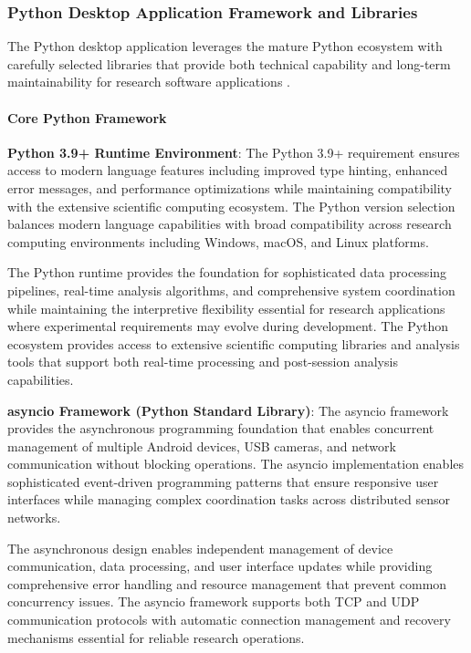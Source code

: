 \documentclass[11pt,a4paper]{article}
\begin{document}
\subsubsection{Python Desktop Application Framework and Libraries}

The Python desktop application leverages the mature Python ecosystem with carefully selected libraries that provide both
technical capability and long-term maintainability for research software applications .

\paragraph{Core Python Framework}

\textbf{Python 3.9+ Runtime Environment}: The Python 3.9+ requirement ensures access to modern language features including
improved type hinting, enhanced error messages, and performance optimizations while maintaining compatibility with the
extensive scientific computing ecosystem. The Python version selection balances modern language capabilities with broad
compatibility across research computing environments including Windows, macOS, and Linux platforms.

The Python runtime provides the foundation for sophisticated data processing pipelines, real-time analysis algorithms,
and comprehensive system coordination while maintaining the interpretive flexibility essential for research applications
where experimental requirements may evolve during development. The Python ecosystem provides access to extensive
scientific computing libraries and analysis tools that support both real-time processing and post-session analysis
capabilities.

\textbf{asyncio Framework (Python Standard Library)}: The asyncio framework provides the asynchronous programming foundation
that enables concurrent management of multiple Android devices, USB cameras, and network communication without blocking
operations. The asyncio implementation enables sophisticated event-driven programming patterns that ensure responsive
user interfaces while managing complex coordination tasks across distributed sensor networks.

The asynchronous design enables independent management of device communication, data processing, and user interface
updates while providing comprehensive error handling and resource management that prevent common concurrency issues. The
asyncio framework supports both TCP and UDP communication protocols with automatic connection management and recovery
mechanisms essential for reliable research operations.
\end{document}
